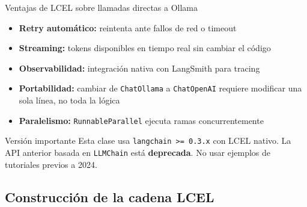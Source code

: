 \documentclass[12pt,a4paper]{article}
\begin{document}
\begin{conceptbox}{Ventajas de LCEL sobre llamadas directas a Ollama}
\begin{itemize}[noitemsep]
  \item \textbf{Retry automático:} reintenta ante fallos de red o timeout
  \item \textbf{Streaming:} tokens disponibles en tiempo real sin cambiar el código
  \item \textbf{Observabilidad:} integración nativa con LangSmith para tracing
  \item \textbf{Portabilidad:} cambiar de \texttt{ChatOllama} a \texttt{ChatOpenAI}
    requiere modificar una sola línea, no toda la lógica
  \item \textbf{Paralelismo:} \texttt{RunnableParallel} ejecuta ramas concurrentemente
\end{itemize}
\end{conceptbox}

\begin{warnbox}{Versión importante}
Esta clase usa \texttt{langchain >= 0.3.x} con LCEL nativo.
La API anterior basada en \texttt{LLMChain} está \textbf{deprecada}.
No usar ejemplos de tutoriales previos a 2024.
\end{warnbox}

\subsection{Construcción de la cadena LCEL}
\end{document}
